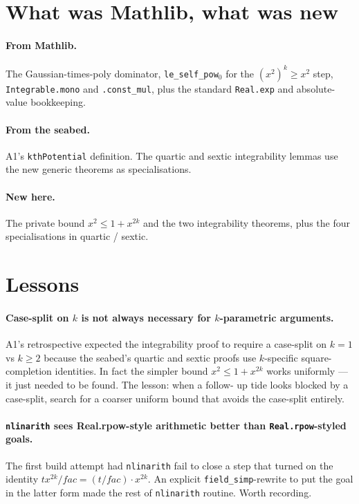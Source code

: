 \documentclass[11pt]{article}
\begin{document}
\section{What was Mathlib, what was new}

\paragraph{From Mathlib.} The Gaussian-times-poly dominator,
\texttt{le\_self\_pow$_0$} for the $(x^2)^k \ge x^2$ step,
\texttt{Integrable.mono} and \texttt{.const\_mul}, plus the
standard \texttt{Real.exp} and absolute-value bookkeeping.

\paragraph{From the seabed.} A1's \texttt{kthPotential} definition.
The quartic and sextic integrability lemmas use the new generic
theorems as specialisations.

\paragraph{New here.} The private bound
$x^2 \le 1 + x^{2k}$ and the two integrability theorems, plus the
four specialisations in quartic / sextic.

\section{Lessons}

\paragraph{Case-split on $k$ is not always necessary for $k$-parametric
arguments.} A1's retrospective expected the integrability proof to
require a case-split on $k = 1$ vs $k \ge 2$ because the seabed's
quartic and sextic proofs use $k$-specific square-completion
identities. In fact the simpler bound $x^2 \le 1 + x^{2k}$ works
uniformly --- it just needed to be found. The lesson: when a follow-
up tide looks blocked by a case-split, search for a coarser uniform
bound that avoids the case-split entirely.

\paragraph{\texttt{nlinarith} sees Real.rpow-style arithmetic
better than \texttt{Real.rpow}-styled goals.} The first build attempt
had \texttt{nlinarith} fail to close a step that turned on the
identity $t x^{2k}/fac = (t/fac) \cdot x^{2k}$. An explicit
\texttt{field\_simp}-rewrite to put the goal in the latter form made
the rest of \texttt{nlinarith} routine. Worth recording.
\end{document}

